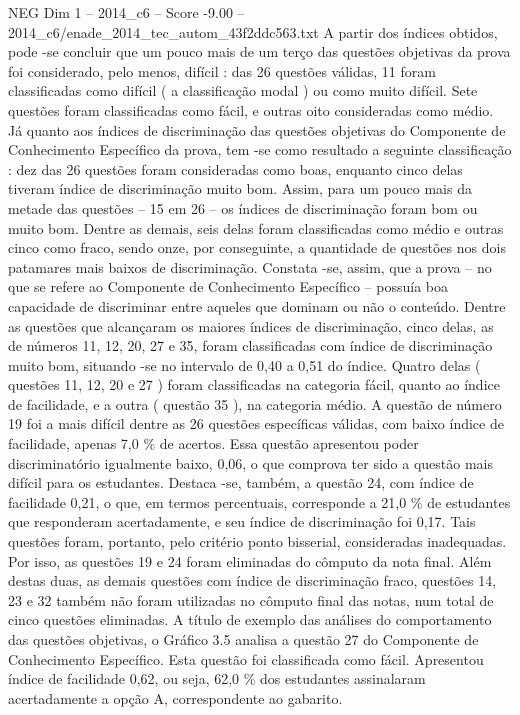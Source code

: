 \begin{textsample}{NEG Dim 1 – 2014\_c6 – Score -9.00 – 2014\_c6/enade\_2014\_tec\_autom\_43f2ddc563.txt}
A partir dos índices obtidos, pode -se concluir que um pouco mais de um terço das questões objetivas da prova foi considerado, pelo menos, difícil : das 26 questões válidas, 11 foram classificadas como difícil ( a classificação modal ) ou como muito difícil.
Sete questões foram classificadas como fácil, e outras oito consideradas como médio.
Já quanto aos índices de discriminação das questões objetivas do Componente de Conhecimento Específico da prova, tem -se como resultado a seguinte classificação : dez das 26 questões foram consideradas como boas, enquanto cinco delas tiveram índice de discriminação muito bom.
Assim, para um pouco mais da metade das questões – 15 em 26 – os índices de discriminação foram bom ou muito bom.
Dentre as demais, seis delas foram classificadas como médio e outras cinco como fraco, sendo onze, por conseguinte, a quantidade de questões nos dois patamares mais baixos de discriminação.
Constata -se, assim, que a prova – no que se refere ao Componente de Conhecimento Específico – possuía boa capacidade de discriminar entre aqueles que dominam ou não o conteúdo.
Dentre as questões que alcançaram os maiores índices de discriminação, cinco delas, as de números 11, 12, 20, 27 e 35, foram classificadas com índice de discriminação muito bom, situando -se no intervalo de 0,40 a 0,51 do índice.
Quatro delas ( questões 11, 12, 20 e 27 ) foram classificadas na categoria fácil, quanto ao índice de facilidade, e a outra ( questão 35 ), na categoria médio.
A questão de número 19 foi a mais difícil dentre as 26 questões específicas válidas, com baixo índice de facilidade, apenas 7,0 \% de acertos.
Essa questão apresentou poder discriminatório igualmente baixo, 0,06, o que comprova ter sido a questão mais difícil para os estudantes.
Destaca -se, também, a questão 24, com índice de facilidade 0,21, o que, em termos percentuais, corresponde a 21,0 \% de estudantes que responderam acertadamente, e seu índice de discriminação foi 0,17.
Tais questões foram, portanto, pelo critério ponto bisserial, consideradas inadequadas.
Por isso, as questões 19 e 24 foram eliminadas do cômputo da nota final.
Além destas duas, as demais questões com índice de discriminação fraco, questões 14, 23 e 32 também não foram utilizadas no cômputo final das notas, num total de cinco questões eliminadas.
A título de exemplo das análises do comportamento das questões objetivas, o Gráfico 3.5 analisa a questão 27 do Componente de Conhecimento Específico.
Esta questão foi classificada como fácil.
Apresentou índice de facilidade 0,62, ou seja, 62,0 \% dos estudantes assinalaram acertadamente a opção A, correspondente ao gabarito.

\end{textsample}
